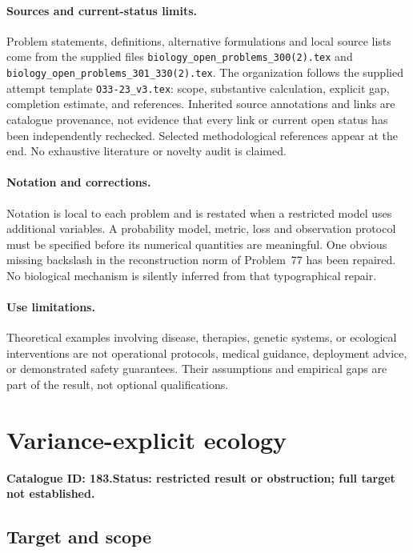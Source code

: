 \documentclass[11pt]{article}
\begin{document}
\paragraph{Sources and current-status limits.}
Problem statements, definitions, alternative formulations and local source lists
come from the supplied files
\texttt{biology\_open\_problems\_300(2).tex} and
\texttt{biology\_open\_problems\_301\_330(2).tex}.
The organization follows the supplied attempt template
\texttt{O33-23\_v3.tex}: scope, substantive calculation, explicit gap,
completion estimate, and references. Inherited source annotations and links are
catalogue provenance, not evidence that every link or current open status has
been independently rechecked. Selected methodological references appear at the
end. No exhaustive literature or novelty audit is claimed.

\paragraph{Notation and corrections.}
Notation is local to each problem and is restated when a restricted model uses
additional variables. A probability model, metric, loss and observation protocol
must be specified before its numerical quantities are meaningful. One obvious
missing backslash in the reconstruction norm of Problem~77 has been repaired.
No biological mechanism is silently inferred from that typographical repair.

\paragraph{Use limitations.}
Theoretical examples involving disease, therapies, genetic systems, or ecological
interventions are not operational protocols, medical guidance, deployment advice,
or demonstrated safety guarantees. Their assumptions and empirical gaps are part
of the result, not optional qualifications.

\setcounter{section}{182}
\section{Variance-explicit ecology}
\label{prob:183}
\noindent\textbf{Catalogue ID: 183.}\quad \textbf{Status: restricted result or obstruction; full target not established.}
\subsection{Target and scope}
\end{document}

